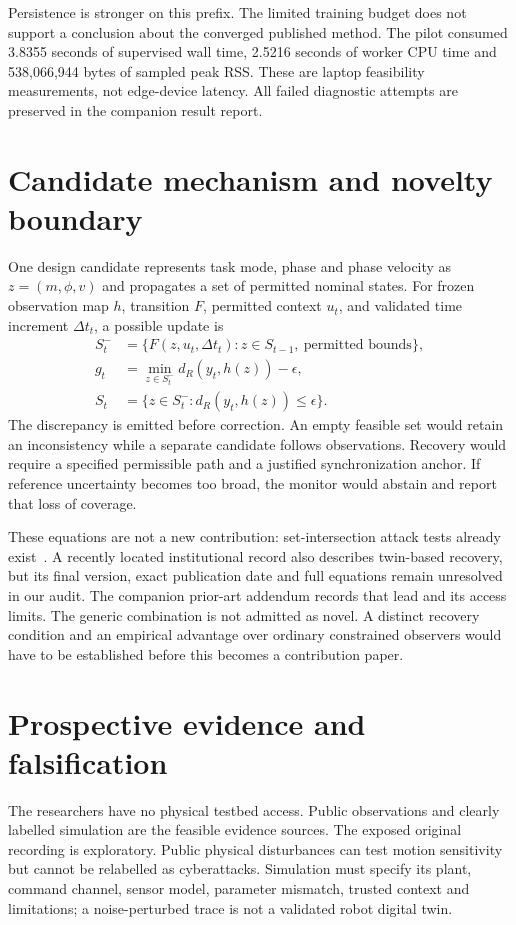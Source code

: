 \documentclass[11pt]{article}
\begin{document}
Persistence is stronger on this prefix. The limited training budget does not support a conclusion about the converged published method. The pilot consumed 3.8355 seconds of supervised wall time, 2.5216 seconds of worker CPU time and 538,066,944 bytes of sampled peak RSS. These are laptop feasibility measurements, not edge-device latency. All failed diagnostic attempts are preserved in the companion result report.

\section{Candidate mechanism and novelty boundary}
One design candidate represents task mode, phase and phase velocity as $z=(m,\phi,v)$ and propagates a set of permitted nominal states. For frozen observation map $h$, transition $F$, permitted context $u_t$, and validated time increment $\Delta t_t$, a possible update is
\begin{align}
S^-_t &= \{F(z,u_t,\Delta t_t): z\in S_{t-1},\ \text{permitted bounds}\},\\
g_t &= \min_{z\in S^-_t} d_R(y_t,h(z))-\epsilon,\\
S_t &= \{z\in S^-_t:d_R(y_t,h(z))\leq\epsilon\}.
\end{align}
The discrepancy is emitted before correction. An empty feasible set would retain an inconsistency while a separate candidate follows observations. Recovery would require a specified permissible path and a justified synchronization anchor. If reference uncertainty becomes too broad, the monitor would abstain and report that loss of coverage.

These equations are not a new contribution: set-intersection attack tests already exist~\cite{setfilter}. A recently located institutional record also describes twin-based recovery, but its final version, exact publication date and full equations remain unresolved in our audit. The companion prior-art addendum records that lead and its access limits. The generic combination is not admitted as novel. A distinct recovery condition and an empirical advantage over ordinary constrained observers would have to be established before this becomes a contribution paper.

\section{Prospective evidence and falsification}
The researchers have no physical testbed access. Public observations and clearly labelled simulation are the feasible evidence sources. The exposed original recording is exploratory. Public physical disturbances can test motion sensitivity but cannot be relabelled as cyberattacks. Simulation must specify its plant, command channel, sensor model, parameter mismatch, trusted context and limitations; a noise-perturbed trace is not a validated robot digital twin.
\end{document}
